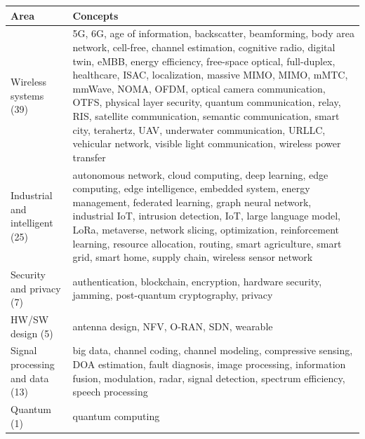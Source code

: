 \begin{tabular}{L{2.6cm}L{9.0cm}}
\toprule
Area & Concepts\\
\midrule
Wireless systems (39) & 5G, 6G, age of information, backscatter, beamforming, body area network, cell-free, channel estimation, cognitive radio, digital twin, eMBB, energy efficiency, free-space optical, full-duplex, healthcare, ISAC, localization, massive MIMO, MIMO, mMTC, mmWave, NOMA, OFDM, optical camera communication, OTFS, physical layer security, quantum communication, relay, RIS, satellite communication, semantic communication, smart city, terahertz, UAV, underwater communication, URLLC, vehicular network, visible light communication, wireless power transfer\\
Industrial and intelligent (25) & autonomous network, cloud computing, deep learning, edge computing, edge intelligence, embedded system, energy management, federated learning, graph neural network, industrial IoT, intrusion detection, IoT, large language model, LoRa, metaverse, network slicing, optimization, reinforcement learning, resource allocation, routing, smart agriculture, smart grid, smart home, supply chain, wireless sensor network\\
Security and privacy (7) & authentication, blockchain, encryption, hardware security, jamming, post-quantum cryptography, privacy\\
HW/SW design (5) & antenna design, NFV, O-RAN, SDN, wearable\\
Signal processing and data (13) & big data, channel coding, channel modeling, compressive sensing, DOA estimation, fault diagnosis, image processing, information fusion, modulation, radar, signal detection, spectrum efficiency, speech processing\\
Quantum (1) & quantum computing\\
\bottomrule
\end{tabular}